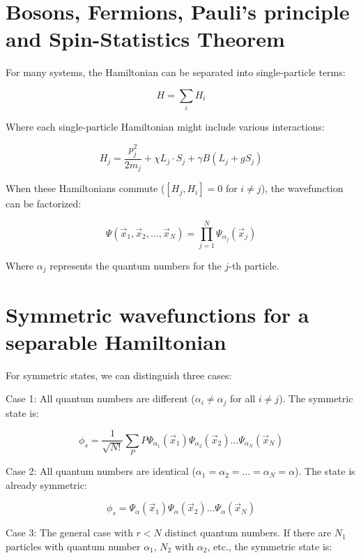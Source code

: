 \section{Bosons, Fermions, Pauli's principle and Spin-Statistics Theorem}
For many systems, the Hamiltonian can be separated into single-particle terms:

\begin{equation}
H=\sum_i H_i
\end{equation}

Where each single-particle Hamiltonian might include various interactions:

\begin{equation}
H_j=\frac{p_j^2}{2m_j}+\chi L_j\cdot S_j+\gamma B(L_j+gS_j)
\end{equation}

When these Hamiltonians commute ($[H_j,H_i]=0$ for $i\neq j$), the wavefunction can be factorized:

\begin{equation}
\Psi(\vec{x}_1,\vec{x}_2,\ldots,\vec{x}_N)=\prod_{j=1}^{N}\Psi_{\alpha_j}(\vec{x}_j)
\end{equation}

Where $\alpha_j$ represents the quantum numbers for the $j$-th particle.

\section{Symmetric wavefunctions for a separable Hamiltonian}
For symmetric states, we can distinguish three cases:

Case 1: All quantum numbers are different ($\alpha_i\neq\alpha_j$ for all $i\neq j$). The symmetric state is:

\begin{equation}
\phi_s=\frac{1}{\sqrt{N!}}\sum_P P\Psi_{\alpha_1}(\vec{x}_1)\Psi_{\alpha_2}(\vec{x}_2)\ldots\Psi_{\alpha_N}(\vec{x}_N)
\end{equation}

Case 2: All quantum numbers are identical ($\alpha_1=\alpha_2=\ldots=\alpha_N=\alpha$). The state is already symmetric:

\begin{equation}
\phi_s=\Psi_{\alpha}(\vec{x}_1)\Psi_{\alpha}(\vec{x}_2)\ldots\Psi_{\alpha}(\vec{x}_N)
\end{equation}

Case 3: The general case with $r<N$ distinct quantum numbers. If there are $N_1$ particles with quantum number $\alpha_1$, $N_2$ with $\alpha_2$, etc., the symmetric state is:

